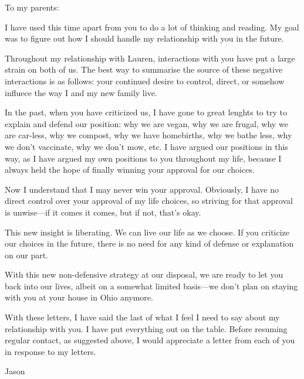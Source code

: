 \documentclass[12pt]{letter}
\begin{document}
\begin{letter}{}

\signature{Jason}


\opening{To my parents:}

I have used this time apart from you to do a lot of thinking and reading.  My goal was to figure out how I should handle my relationship with you in the future.
\vspace{.25in}

Throughout my relationship with Lauren, interactions with you have put a large strain on both of us.  The best way to summarise the source of these negative interactions is as follows:  your continued desire to control, direct, or somehow influece the way I and my new family live.

In the past, when you have criticized us, I have gone to great lenghts to try to explain and defend our position:  why we are vegan, why we are frugal, why we are car-less, why we compost, why we have homebirths, why we bathe less, why we don't vaccinate, why we don't mow, etc.  I have argued our positions in this way, as I have argued my own positions to you throughout my life, because I always held the hope of finally winning your approval for our choices.

Now I understand that I may never win your approval.  Obviously, I have no direct control over your approval of my life choices, so striving for that approval is unwise---if it comes it comes, but if not, that's okay.

This new insight is liberating.  We can live our life as we choose.  If you criticize our choices in the future, there is no need for any kind of defense or explanation on our part.

With this new non-defensive strategy at our disposal, we are ready to let you back into our lives, albeit on a somewhat limited basis---we don't plan on staying with you at your house in Ohio anymore.

With these letters, I have said the last of what I feel I need to say about my relationship with you.  I have put everything out on the table.  Before resuming regular contact, as suggested above, I would appreciate a letter from each of you in response to my letters.

\vspace{.25in}

\noindent Jason

\end{letter}
\end{document}
